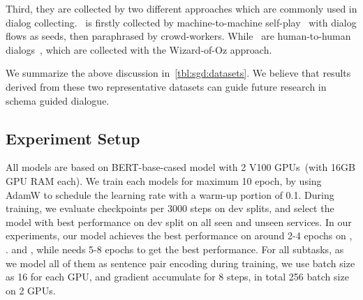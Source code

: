 Third, they are collected by two different approaches which are
commonly used in dialog collecting. \sgdst~is firstly collected by
machine-to-machine self-play~\cite[M2M,][]{shah2018building} with
dialog flows as seeds, then paraphrased by crowd-workers. While
\multiwoz~are human-to-human
dialogs~\cite[H2H,][]{kelley1984iterative}, which are collected with
the Wizard-of-Oz approach.

We summarize the above discussion in~\autoref{tbl:sgd:datasets}.  We
believe that results derived from these two representative datasets can
guide future research in schema guided dialogue.


\subsection{Experiment Setup}
\label{ssec:sgd:exp-setup}
All models are based on BERT-base-cased model with 2 V100 GPUs~(with
16GB GPU RAM each). We train each models for maximum 10 epoch, by
using AdamW to schedule the learning rate with a warm-up portion of
0.1. During training, we evaluate checkpoints per 3000 steps on dev
splits, and select the model with best performance on dev split on all
seen and unseen services. In our experiments, our model achieves the
best performance on around 2-4 epochs on \IC, \RSI. and \CSL, while
\NSL needs 5-8 epochs to get the best performance. For all subtasks, as
we model all of them as sentence pair encoding during training, we use
batch size as 16 for each GPU, and gradient accumulate for 8 steps, in
total 256 batch size on 2 GPUs.

